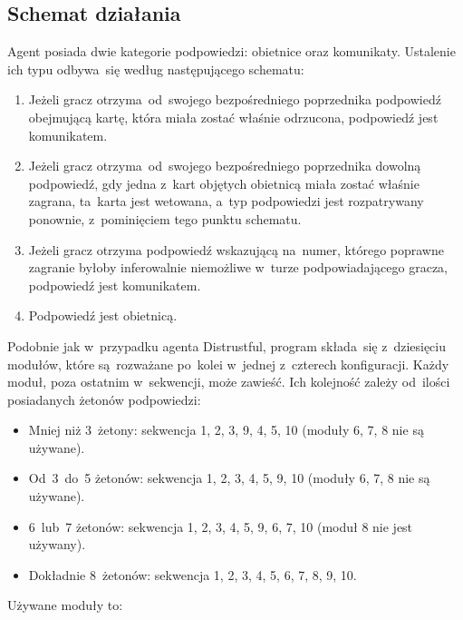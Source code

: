 \documentclass[declaration,shortabstract,inz]{iithesis}
\begin{document}
\subsection*{Schemat działania}

Agent posiada dwie kategorie podpowiedzi: obietnice oraz komunikaty. Ustalenie ich typu odbywa~się według następującego schematu:

\begin{enumerate}
	\item Jeżeli gracz otrzyma od~swojego bezpośredniego poprzednika podpowiedź obejmującą kartę, która miała zostać właśnie odrzucona, podpowiedź jest komunikatem.
	\item Jeżeli gracz otrzyma od~swojego bezpośredniego poprzednika dowolną podpowiedź, gdy jedna z~kart objętych obietnicą miała zostać właśnie zagrana, ta~karta jest wetowana, a~typ podpowiedzi jest rozpatrywany ponownie, z~pominięciem tego punktu schematu.
	\item Jeżeli gracz otrzyma podpowiedź wskazującą na~numer, którego poprawne zagranie byłoby inferowalnie niemożliwe w~turze podpowiadającego gracza, podpowiedź jest komunikatem.
	\item Podpowiedź jest obietnicą.
\end{enumerate}

Podobnie jak w~przypadku agenta Distrustful, program składa~się z~dziesięciu modułów, które są~rozważane po~kolei w~jednej z~czterech konfiguracji. Każdy moduł, poza ostatnim w~sekwencji, może zawieść. Ich kolejność zależy od~ilości posiadanych żetonów podpowiedzi:

\begin{itemize}
	\item Mniej niż 3~żetony: sekwencja 1, 2, 3, 9, 4, 5, 10 (moduły 6, 7, 8 nie są używane).
	\item Od~3~do~5 żetonów: sekwencja 1, 2, 3, 4, 5, 9, 10 (moduły 6, 7, 8 nie są używane).
	\item 6~lub~7 żetonów: sekwencja 1, 2, 3, 4, 5, 9, 6, 7, 10 (moduł 8 nie jest używany).
	\item Dokładnie 8~żetonów: sekwencja 1, 2, 3, 4, 5, 6, 7, 8, 9, 10.
\end{itemize}
Używane moduły to:
\end{document}
